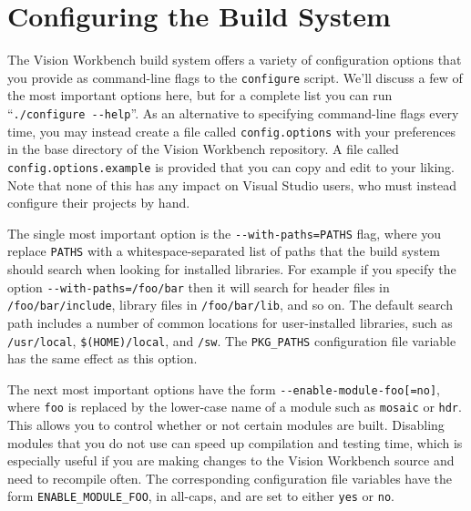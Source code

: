 \begin{center}
\end{center}

\section{Configuring the Build System}\label{sec:config-build}

The Vision Workbench build system offers a variety of configuration
options that you provide as command-line flags to the \verb#configure#
script.  We'll discuss a few of the most important options here, but
for a complete list you can run ``\verb#./configure --help#''.  As an
alternative to specifying command-line flags every time, you may
instead create a file called \verb#config.options# with your
preferences in the base directory of the Vision Workbench repository.
A file called \verb#config.options.example# is provided that you can
copy and edit to your liking.  Note that none of this has any impact
on Visual Studio users, who must instead configure their projects by
hand.

The single most important option is the \verb#--with-paths=PATHS# 
flag, where you replace \verb#PATHS# with a whitespace-separated list of 
paths that the build system should search when looking for installed 
libraries.  For example if you specify the option \verb#--with-paths=/foo/bar# 
then it will search for header files in \verb#/foo/bar/include#, library 
files in \verb#/foo/bar/lib#, and so on.  The default search path includes 
a number of common locations for user-installed libraries, such as 
\verb#/usr/local#, \verb#$(HOME)/local#, and \verb#/sw#.  The \verb#PKG_PATHS# 
configuration file variable has the same effect as this option.

The next most important options have the form
\verb#--enable-module-foo[=no]#, where \verb#foo# is replaced by the
lower-case name of a module such as \verb#mosaic# or \verb#hdr#.  This
allows you to control whether or not certain modules are built.
Disabling modules that you do not use can speed up compilation and
testing time, which is especially useful if you are making changes to
the Vision Workbench source and need to recompile often.  The
corresponding configuration file variables have the form
\verb#ENABLE_MODULE_FOO#, in all-caps, and are set to either
\verb#yes# or \verb#no#.


